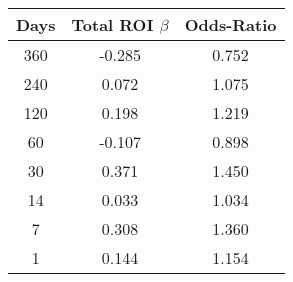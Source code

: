 \begin{tabular}{||c c c||}
\hline
Days & Total ROI $\beta$ & Odds-Ratio \\
\hline\hline
360 & -0.285 & 0.752 \\
240 & 0.072 & 1.075 \\
120 & 0.198 & 1.219 \\
60 & -0.107 & 0.898 \\
30 & 0.371 & 1.450 \\
14 & 0.033 & 1.034 \\
7 & 0.308 & 1.360 \\
1 & 0.144 & 1.154 \\
\hline
\end{tabular}
